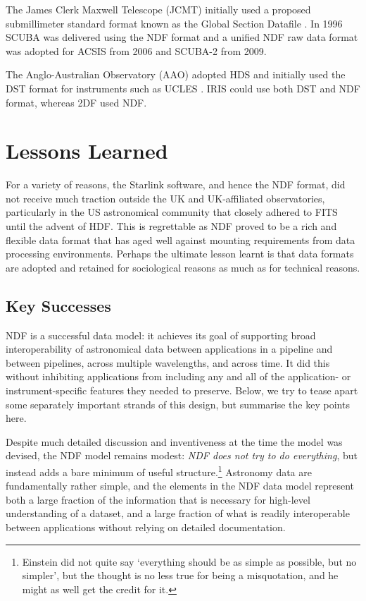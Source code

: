 \documentclass[final,authoryear,5p,times,twocolumn]{elsarticle}
\begin{document}
The James Clerk Maxwell Telescope (JCMT) initially used a proposed
submillimeter standard format known as the Global Section Datafile
\citep[GSD;][formerly General Single Dish Data]{sun229}. In 1996 SCUBA
\citep{1999MNRAS.303..659H} was delivered using the NDF format and a
unified NDF raw data format was adopted for ACSIS
\citep{2009MNRAS.399.1026B} from 2006 and SCUBA-2
\citep{2013MNRAS.430.2513H} from 2009.

The Anglo-Australian Observatory (AAO) adopted HDS and initially used
the DST format for instruments such as UCLES
\citep{1990SPIE.1235..562D}. IRIS \citep{1993PASAu..10..298A} could
use both DST and NDF format, whereas 2DF \citep{2002MNRAS.333..279L}
used NDF.

\section{Lessons Learned}
\label{sec:lessons}

For a variety of reasons, the Starlink software, and hence the NDF
format, did not receive much traction outside the UK and UK-affiliated
observatories, particularly in
the US astronomical community that closely adhered to FITS until the
advent of HDF. This is regrettable as NDF proved to be a rich and
flexible data format that has aged well against mounting requirements
from data processing environments. Perhaps the ultimate lesson learnt
is that data formats are adopted and retained for sociological reasons
as much as for technical reasons.

\subsection{Key Successes}
\label{sec:success}

NDF is a successful data model: it achieves its goal of supporting
broad interoperability of astronomical data between applications in a
pipeline and between pipelines, across multiple wavelengths, and
across time.  It did this without inhibiting applications from
including any and all of the application- or instrument-specific
features they needed to preserve.  Below, we try to tease apart some
separately important strands of this design, but summarise the key
points here.

Despite much detailed discussion and inventiveness at the time the
model was devised, the NDF model remains modest: \emph{NDF does not
  try to do everything}, but instead adds a bare minimum of useful
structure.\footnote{Einstein did not quite say `everything should be
  as simple as possible, but no simpler', but the thought is no less
  true for being a misquotation, and he might as well get the credit
  for it.}  Astronomy data are fundamentally rather simple, and the
elements in the NDF data model represent both a large fraction of the
information that is necessary for high-level understanding of a
dataset, and a large fraction of what is readily interoperable between
applications without relying on detailed documentation.
\end{document}
